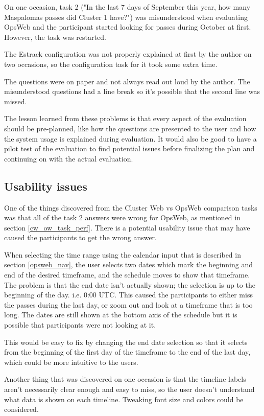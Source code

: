 On one occasion, task 2 ("In the last 7 days of September this year, how many Maspalomas passes did Cluster 1 have?") was misunderstood when evaluating OpsWeb and the participant started looking for passes during October at first. However, the task was restarted.

The Estrack configuration was not properly explained at first by the author on two occasions, so the configuration task for it took some extra time.

The questions were on paper and not always read out loud by the author. The misunderstood questions had a line break so it's possible that the second line was missed. 

The lesson learned from these problems is that every aspect of the evaluation should be pre-planned, like how the questions are presented to the user and how the system usage is explained during evaluation. It would also be good to have a pilot test of the evaluation to find potential issues before finalizing the plan and continuing on with the actual evaluation.

\subsection{Usability issues} \label{usability_issues}
One of the things discovered from the Cluster Web vs OpsWeb comparison tasks was that all of the task 2 answers were wrong for OpsWeb, as mentioned in section \ref{cw_ow_task_perf}. There is a potential usability issue that may have caused the participants to get the wrong answer.

When selecting the time range using the calendar input that is described in section \ref{opsweb_nav}, the user selects two dates which mark the beginning and end of the desired timeframe, and the schedule moves to show that timeframe. The problem is that the end date isn't actually shown; the selection is up to the beginning of the day. i.e. 0:00 UTC. This caused the participants to either miss the passes during the last day, or zoom out and look at a timeframe that is too long. The dates are still shown at the bottom axis of the schedule but it is possible that participants were not looking at it.

This would be easy to fix by changing the end date selection so that it selects from the beginning of the first day of the timeframe to the end of the last day, which could be more intuitive to the users.

Another thing that was discovered on one occasion is that the timeline labels aren't necessarily clear enough and easy to miss, so the user doesn't understand what data is shown on each timeline. Tweaking font size and colors could be considered.

